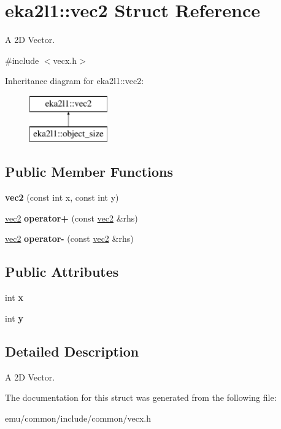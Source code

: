 \hypertarget{structeka2l1_1_1vec2}{}\section{eka2l1\+:\+:vec2 Struct Reference}
\label{structeka2l1_1_1vec2}


A 2D Vector.  




{\ttfamily \#include $<$vecx.\+h$>$}

Inheritance diagram for eka2l1\+:\+:vec2\+:\begin{figure}[H]
\begin{center}
\leavevmode
\includegraphics[height=2.000000cm]{structeka2l1_1_1vec2}
\end{center}
\end{figure}
\subsection*{Public Member Functions}
\begin{DoxyCompactItemize}
\item 
\mbox{\label{structeka2l1_1_1vec2_aa0f685f18281a699ba67acb934fae624}} 
{\bfseries vec2} (const int x, const int y)
\item 
\mbox{\label{structeka2l1_1_1vec2_a9083005255885f30ead70674b4c8974f}} 
\mbox{\hyperlink{structeka2l1_1_1vec2}{vec2}} {\bfseries operator+} (const \mbox{\hyperlink{structeka2l1_1_1vec2}{vec2}} \&rhs)
\item 
\mbox{\label{structeka2l1_1_1vec2_a24fc6b2067cbda7b43537a34c672f9c4}} 
\mbox{\hyperlink{structeka2l1_1_1vec2}{vec2}} {\bfseries operator-\/} (const \mbox{\hyperlink{structeka2l1_1_1vec2}{vec2}} \&rhs)
\end{DoxyCompactItemize}
\subsection*{Public Attributes}
\begin{DoxyCompactItemize}
\item 
\mbox{\label{structeka2l1_1_1vec2_a5fcaee46e0ef1271a97de5bbc9f5e338}} 
int {\bfseries x}
\item 
\mbox{\label{structeka2l1_1_1vec2_acffe5ac1cc115b0aadbecf37090c80be}} 
int {\bfseries y}
\end{DoxyCompactItemize}


\subsection{Detailed Description}
A 2D Vector. 

The documentation for this struct was generated from the following file\+:\begin{DoxyCompactItemize}
\item 
emu/common/include/common/vecx.\+h\end{DoxyCompactItemize}
